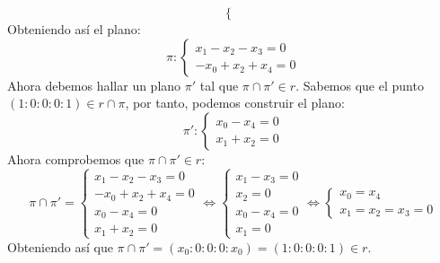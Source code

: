 {\[\begin{cases}
    \end{cases}
    \]
    Obteniendo así el plano:
    \[
        \pi :
        \begin{cases}
            x_1 - x_2 - x_3 = 0 \\
            -x_0 + x_2 + x_4 = 0
        \end{cases}
    \]
    Ahora debemos hallar un plano $\pi'$ tal que $\pi \cap \pi' \in r$. Sabemos que el punto $(1 : 0 : 0 : 0 : 1) \in r \cap \pi$, por tanto, podemos construir el plano:
    \[
        \pi' :
        \begin{cases}
            x_0 - x_4 = 0 \\
            x_1 + x_2 = 0
        \end{cases}
    \]
    Ahora comprobemos que $\pi \cap \pi' \in r$:
    \[
        \pi \cap \pi' =
        \begin{cases}
            x_1 - x_2 - x_3 = 0 \\
            -x_0 + x_2 + x_4 = 0 \\
            x_0 - x_4 = 0 \\
            x_1 + x_2 = 0
        \end{cases}
        \iff
        \begin{cases}
            x_1 - x_3 = 0\\
            x_2 = 0\\
            x_0 - x_4 = 0 \\
            x_1 = 0
        \end{cases}
        \iff
        \begin{cases}
            x_0 = x_4 \\
            x_1 = x_2 = x_3 = 0
        \end{cases}
    \]
    Obteniendo así que $\pi \cap \pi' = (x_0 : 0 : 0 : 0 : x_0) = (1 : 0 : 0 : 0 : 1) \in r$.
}

